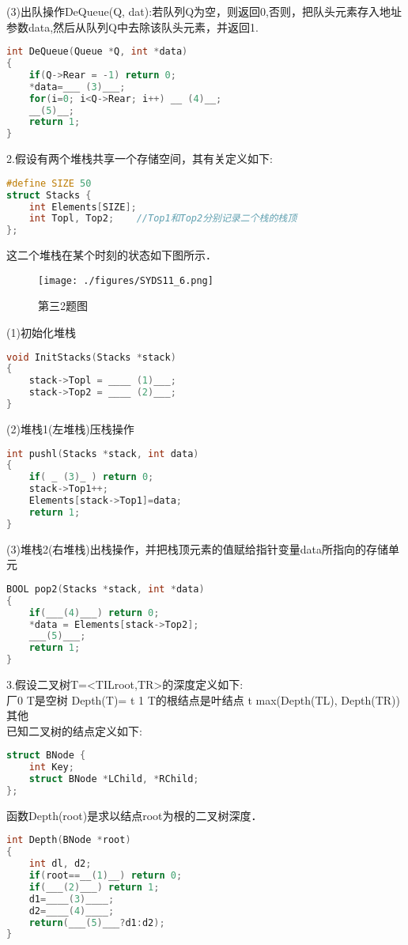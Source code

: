(3)出队操作DeQueue(Q, dat):若队列Q为空，则返回0,否则，把队头元素存入地址参数data,然后从队列Q中去除该队头元素，并返回1.
\begin{lstlisting}[language=cpp]
int DeQueue(Queue *Q, int *data)
{
    if(Q->Rear = -1) return 0;
    *data=___ (3)___;
    for(i=0; i<Q->Rear; i++) __ (4)__;
    __(5)__;
    return 1;
}
\end{lstlisting}

2.假设有两个堆栈共享一个存储空间，其有关定义如下:
\begin{lstlisting}[language=cpp]
#define SIZE 50
struct Stacks {
    int Elements[SIZE];
    int Topl, Top2;    //Top1和Top2分别记录二个栈的栈顶
};
\end{lstlisting}
这二个堆栈在某个时刻的状态如下图所示．
\begin{figure}[ht]
\centering
\texttt{[image: ./figures/SYDS11\_6.png]}
\caption{第三2题图} \label{SYDS11_fig6}
\end{figure}
(1)初始化堆栈
\begin{lstlisting}[language=cpp]
void InitStacks(Stacks *stack)
{
    stack->Topl = ____ (1)___;
    stack->Top2 = ____ (2)___;
}
\end{lstlisting}
(2)堆栈1(左堆栈)压栈操作
\begin{lstlisting}[language=cpp]
int pushl(Stacks *stack, int data)
{
    if( _ (3)_ ) return 0;
    stack->Top1++;
    Elements[stack->Top1]=data;
    return 1;
}
\end{lstlisting}
(3)堆栈2(右堆栈)出栈操作，并把栈顶元素的值赋给指针变量data所指向的存储单元
\begin{lstlisting}[language=cpp]
BOOL pop2(Stacks *stack, int *data)
{
    if(___(4)___) return 0;
    *data = Elements[stack->Top2];
    ___(5)___;
    return 1;
}
\end{lstlisting}

3.假设二叉树T=<TILroot,TR>的深度定义如下: \\
厂0
T是空树
Depth(T)= t 1
T的根结点是叶结点
t max(Depth(TL), Depth(TR))其他
\\
已知二叉树的结点定义如下:
\begin{lstlisting}[language=cpp]
struct BNode {
    int Key;
    struct BNode *LChild, *RChild;
};
\end{lstlisting}
函数Depth(root)是求以结点root为根的二叉树深度．
\begin{lstlisting}[language=cpp]
int Depth(BNode *root)
{
    int dl, d2;
    if(root==__(1)__) return 0;
    if(___(2)___) return 1;
    d1=____(3)____;
    d2=____(4)____;
    return(___(5)___?d1:d2);
}
\end{lstlisting}


